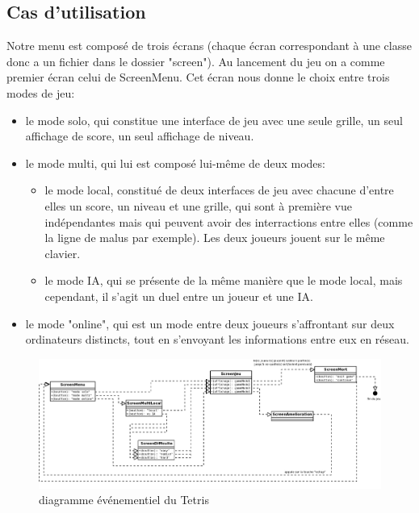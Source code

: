 \documentclass[a4paper, 11pt]{article}
\begin{document}
        \subsection{Cas d'utilisation}
            Notre menu est composé de trois écrans (chaque écran correspondant à une classe donc a un fichier dans le dossier "screen"). Au lancement du jeu on a comme premier écran celui de ScreenMenu. Cet écran nous donne le choix entre trois modes de jeu:
            \begin{itemize}
                \item le mode solo, qui constitue une interface de jeu avec une seule grille, un seul affichage de score, un seul affichage de niveau.
                \item le mode multi, qui lui est composé lui-même de deux modes:
                \begin{itemize}
                    \item le mode local, constitué de deux interfaces de jeu avec chacune d'entre elles un score, un niveau et une grille, qui sont à première vue indépendantes mais qui peuvent avoir des interractions entre elles (comme la ligne de malus par exemple). Les deux joueurs jouent sur le même clavier.
                    \item le mode IA, qui se présente de la même manière que le mode local, mais cependant, il s'agit un duel entre un joueur et une IA.
                \end{itemize}
                \item le mode "online", qui est un mode entre deux joueurs s'affrontant sur deux ordinateurs distincts, tout en s'envoyant les informations entre eux en réseau.
            \end{itemize}
            
            \begin{figure}[ht]
                \centering
                \includegraphics[scale=0.30]{images/diagrammeEvenementiel.png}
                \caption{diagramme événementiel du Tetris}
            \end{figure}
            
\end{document}
